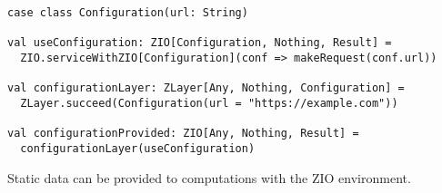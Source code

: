 \begin{algorithm}

\begin{verbatim}
case class Configuration(url: String)

val useConfiguration: ZIO[Configuration, Nothing, Result] =
  ZIO.serviceWithZIO[Configuration](conf => makeRequest(conf.url))

val configurationLayer: ZLayer[Any, Nothing, Configuration] =
  ZLayer.succeed(Configuration(url = "https://example.com"))

val configurationProvided: ZIO[Any, Nothing, Result] =
  configurationLayer(useConfiguration)
\end{verbatim}

\caption{Static data can be provided to computations with the ZIO environment. \label{zio:environment-simple}}
\end{algorithm}